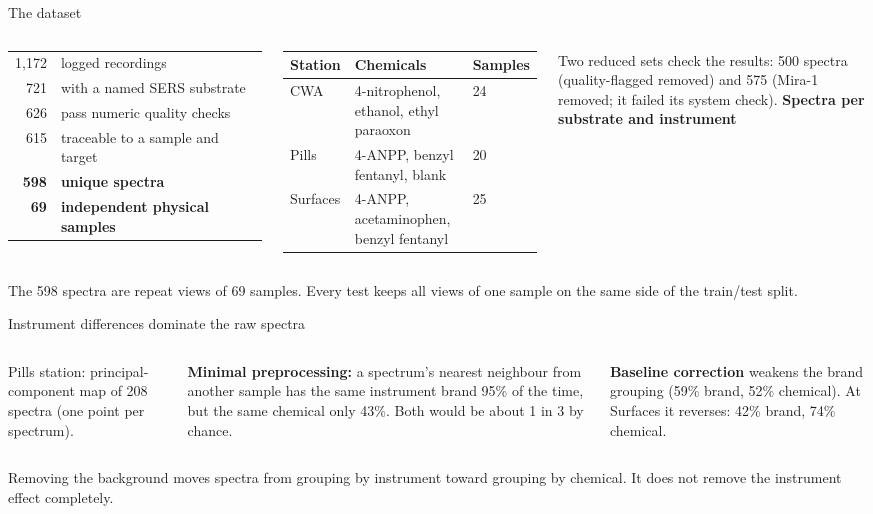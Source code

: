 \documentclass[aspectratio=169,10pt]{beamer}
\newcommand{\takeaway}[1]{%
  \par\vspace{2pt}\noindent\colorbox{cTake}{\parbox{\dimexpr\textwidth-2\fboxsep\relax}{\small #1}}}
\begin{document}
\begin{frame}{The dataset}
\begin{columns}[T,onlytextwidth]
\small
\begin{tabular}{@{}r@{\;\;}l@{}}
1,172 & logged recordings\\
721 & with a named SERS substrate\\
626 & pass numeric quality checks\\
615 & traceable to a sample and target\\
\textbf{598} & \textbf{unique spectra}\\
\textbf{69} & \textbf{independent physical samples}\\
\end{tabular}

\medskip
\scriptsize
\begin{tabular}{@{}lll@{}}
\toprule
Station & Chemicals & Samples\\
\midrule
CWA & 4-nitrophenol, ethanol, ethyl paraoxon & 24\\
Pills & 4-ANPP, benzyl fentanyl, blank & 20\\
Surfaces & 4-ANPP, acetaminophen, benzyl fentanyl & 25\\
\bottomrule
\end{tabular}

\medskip
Two reduced sets check the results: 500 spectra (quality-flagged removed) and 575 (Mira-1 removed; it failed its system check).
\centering
\scriptsize\textbf{Spectra per substrate and instrument}\par\smallskip

\end{columns}
\takeaway{The 598 spectra are repeat views of 69 samples. Every test keeps all views of one sample on the same side of the train/test split.}
\end{frame}

\begin{frame}{Instrument differences dominate the raw spectra}
\begin{columns}[c,onlytextwidth]
\centering

\small
Pills station: principal-component map of 208 spectra (one point per spectrum).

\medskip
\textbf{Minimal preprocessing:} a spectrum's nearest neighbour from another sample has the same instrument brand 95\% of the time, but the same chemical only 43\%. Both would be about 1 in 3 by chance.

\medskip
\textbf{Baseline correction} weakens the brand grouping (59\% brand, 52\% chemical). At Surfaces it reverses: 42\% brand, 74\% chemical.
\end{columns}
\takeaway{Removing the background moves spectra from grouping by instrument toward grouping by chemical. It does not remove the instrument effect completely.}
\end{frame}
\end{document}
